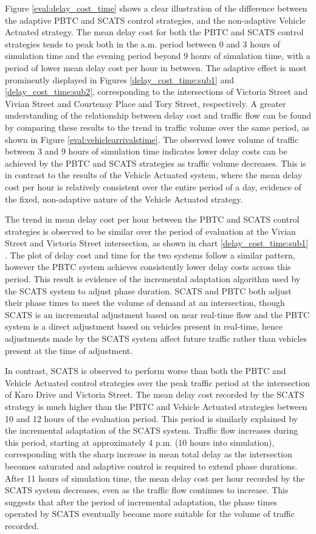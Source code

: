 Figure \ref{eval:delay_cost_time} shows a clear illustration of the difference between the adaptive PBTC and SCATS control strategies, and the non-adaptive Vehicle Actuated strategy. The mean delay cost for both the PBTC and SCATS control strategies tends to peak both in the a.m. period between 0 and 3 hours of simulation time and the evening period beyond 9 hours of simulation time, with a period of lower mean delay cost per hour in between. The adaptive effect is most prominently displayed in Figures \ref{delay_cost_time:sub1} and \ref{delay_cost_time:sub2}, corresponding to the intersections of Victoria Street and Vivian Street and Courtenay Place and Tory Street, respectively. A greater understanding of the relationship between delay cost and traffic flow can be found by comparing these results to the trend in traffic volume over the same period, as shown in Figure \ref{eval:vehiclearrivalstime}. The observed lower volume of traffic between 3 and 9 hours of simulation time indicates lower delay costs can be achieved by the PBTC and SCATS strategies as traffic volume decreases. This is in contrast to the results of the Vehicle Actuated system, where the mean delay cost per hour is relatively consistent over the entire period of a day, evidence of the fixed, non-adaptive nature of the Vehicle Actuated strategy.

The trend in mean delay cost per hour between the PBTC and SCATS control strategies is observed to be similar over the period of evaluation at the Vivian Street and Victoria Street intersection, as shown in chart \ref{delay_cost_time:sub1} . The plot of delay cost and time for the two systems follow a similar pattern, however the PBTC system achieves consistently lower delay costs across this period. This result is evidence of the incremental adaptation algorithm used by the SCATS system to adjust phase duration. SCATS and PBTC both adjust their phase times to meet the volume of demand at an intersection, though SCATS is an incremental adjustment based on near real-time flow and the PBTC system is a direct adjustment based on vehicles present in real-time, hence adjustments made by the SCATS system affect future traffic rather than vehicles present at the time of adjustment.

In contrast, SCATS is observed to perform worse than both the PBTC and Vehicle Actuated control strategies over the peak traffic period at the intersection of Karo Drive and Victoria Street. The mean delay cost recorded by the SCATS strategy is much higher than the PBTC and Vehicle Actuated strategies between 10 and 12 hours of the evaluation period. This period is similarly explained by the incremental adaptation of the SCATS system. Traffic flow increases during this period, starting at approximately 4 p.m. (10 hours into simulation), corresponding with the sharp increase in mean total delay as the intersection becomes saturated and adaptive control is required to extend phase durations. After 11 hours of simulation time, the mean delay cost per hour recorded by the SCATS system decreases, even as the traffic flow continues to increase. This suggests that after the period of incremental adaptation, the phase times operated by SCATS eventually become more suitable for the volume of traffic recorded. 

